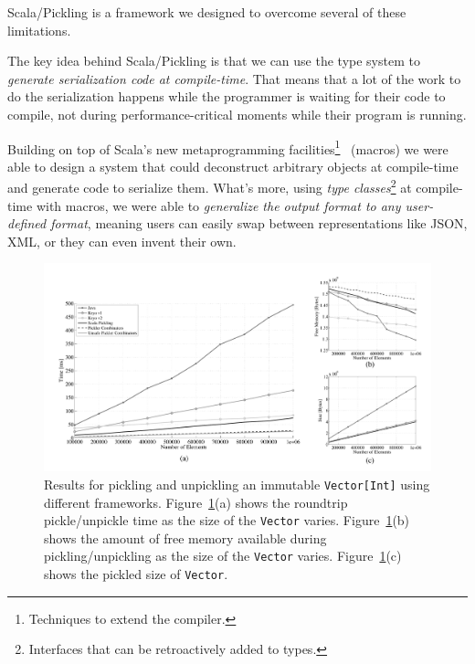 \documentclass[acmtocl]{acmtrans2m}
\begin{document}
Scala/Pickling is a framework we designed to overcome several of these
limitations.

The key idea behind Scala/Pickling is that we can use the type system to
\textit{generate serialization code at compile-time}. That means that a lot of
the work to do the serialization happens while the programmer is waiting for
their code to compile, not during performance-critical moments while their
program is running.

Building on top of Scala's new metaprogramming facilities\footnote{Techniques
to extend the compiler.}~\cite{ScalaMacros} (macros) we were able to design a
system that could deconstruct arbitrary objects at compile-time and generate
code to serialize them. What's more, using \textit{type
classes}\footnote{Interfaces that can be retroactively added to types.} at
compile-time with macros, we were able to \textit{generalize the output format
to any user-defined format}, meaning users can easily swap between
representations like JSON, XML, or they can even invent their own.

\begin{figure}[t!]
 \centering
 \includegraphics[width=\textwidth]{travInt-all.pdf}
 \caption{\footnotesize Results for pickling and unpickling an immutable
   \texttt{Vector[Int]} using different frameworks. Figure~\ref{fig:results-vector}(a) shows the roundtrip pickle/unpickle time as the size of the \texttt{Vector} varies. Figure~\ref{fig:results-vector}(b) shows the amount of free memory available during pickling/unpickling as the size of the \texttt{Vector} varies. Figure~\ref{fig:results-vector}(c) shows the pickled size of \texttt{Vector}.}
 \label{fig:results-vector}
\end{figure}
\end{document}
